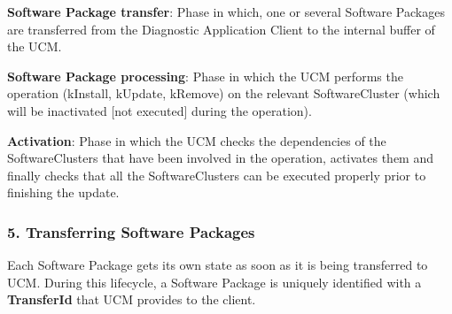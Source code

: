 \begin{DoxyItemize}
\item {\bfseries Software Package transfer}\+: Phase in which, one or several Software Packages are transferred from the Diagnostic Application Client to the internal buffer of the U\+CM.
\item {\bfseries Software Package processing}\+: Phase in which the U\+CM performs the operation (k\+Install, k\+Update, k\+Remove) on the relevant Software\+Cluster (which will be inactivated \mbox{[}not executed\mbox{]} during the operation).
\item {\bfseries Activation}\+: Phase in which the U\+CM checks the dependencies of the Software\+Clusters that have been involved in the operation, activates them and finally checks that all the Software\+Clusters can be executed properly prior to finishing the update.
\end{DoxyItemize}

\subsubsection*{5. Transferring Software Packages}

Each Software Package gets its own state as soon as it is being transferred to U\+CM. During this lifecycle, a Software Package is uniquely identified with a {\bfseries Transfer\+Id} that U\+CM provides to the client.




